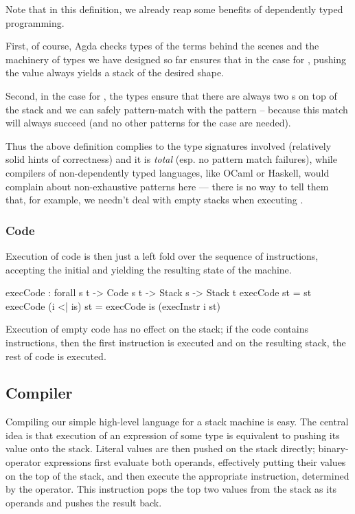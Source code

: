 Note that in this definition, we already reap some benefits of dependently
typed programming.

First, of course, Agda checks types of the terms behind
the scenes and the machinery of types we have designed so far ensures that
in the case for , pushing the value  always yields
a stack of the desired shape.

Second, in the case for , the types ensure that there are always two
s on top of the stack and we can safely pattern-match with the
pattern  \scons {} \scons {} -- because this match
will always succeed (and no other patterns for the  case are needed). 

Thus the above definition complies to the type signatures involved (relatively
solid hints of correctness) and it is \emph{total} (esp. no pattern match failures),
while compilers of non-dependently typed languages, like OCaml or Haskell,
would complain about non-exhaustive patterns here --- there is no way to tell them
that, for example, we needn't deal with empty stacks when executing .

\subsubsection{Code}

Execution of code is then just a left fold over the sequence of instructions,
accepting the initial and yielding the resulting state of the machine.

\begin{code}
  execCode : forall {s t} -> Code s t -> Stack s -> Stack t
  execCode \nil st = st
  execCode (i <| is) st = execCode is (execInstr i st)
\end{code}

\noindent Execution of empty code has no effect on the stack; if the code
contains instructions, then the first instruction is executed and on the
resulting stack, the rest of code is executed.

\subsection{Compiler}

Compiling our simple high-level language for a stack machine is easy. The
central idea is that execution of an expression of some type is equivalent to
pushing its value onto the stack. Literal values are then pushed on the stack
directly; binary-operator expressions first evaluate both operands, effectively
putting their values on the top of the stack, and then execute the appropriate
instruction, determined by the operator. This instruction pops the top
two values from the stack as its operands and pushes the result back.

